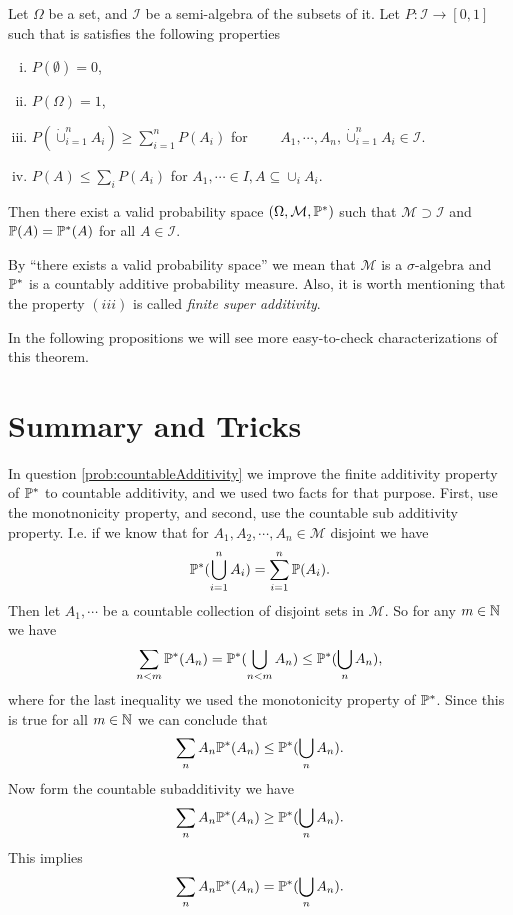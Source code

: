 \begin{theorem}
	Let $ \Omega  $ be a set, and $ \mathcal{I} $ be a semi-algebra of the subsets of it. Let $ P: \mathcal{I} \to [0,1] $ such that is satisfies the following properties
	\begin{enumerate}[(i),nosep]
		\item $ P(\emptyset) = 0  $,
		\item $ P(\Omega) = 1 $,
		\item $ P(\dot\cup_{i=1}^{n} A_i) \geq \sum_{i=1}^n P(A_i) $ for $\qquad  A_1,\cdots,A_n, \dot\cup_{i=1}^{n} A_i \in \mathcal{I}$.
		\item $ P(A) \leq \sum_i P(A_i) $ for $ A_1,\cdots \in I, A \subseteq \cup_i A_i $.
	\end{enumerate}
	Then there exist a valid probability space $ (\Omega, \mathcal{M}, \mathbb{P}^*) $ such that $ \mathcal{M} \supset \mathcal{I} $ and $ \mathbb{P}(A)= \mathbb{P}^*(A)$ for all $ A \in \mathcal{I} $.
\end{theorem}
\begin{remark}
	By ``there exists a valid probability space'' we mean that $ \mathcal{M} $ is a $ \sigma\text{-algebra} $ and $ \mathbb{P}^* $ is a countably additive probability measure. Also, it is worth mentioning that the property $ (iii) $ is called \emph{finite super additivity}.
\end{remark}
In the following propositions we will see more easy-to-check characterizations of this theorem.


\section{Summary and Tricks}
\begin{summary}
	In question \autoref{prob:countableAdditivity} we improve the finite additivity property of $ \mathbb{P}^* $ to countable additivity, and we used two facts for that purpose. First, use the monotnonicity property, and second, use the countable sub additivity property. I.e. if we know that for $ A_1, A_2, \cdots, A_n \in \mathcal{M} $ disjoint we have
	\[ \mathbb{P}^*(\bigcup_{i=1}^{n} A_i) = \sum_{i=1}^n \mathbb{P}(A_i). \]
	Then let $ A_1,\cdots $ be a countable collection of disjoint sets in $ \mathcal{M} $. So for any $ m\in \mathbb{N} $ we have
	\[ \sum_{n<m} \mathbb{P}^*(A_n) = \mathbb{P}^*(\bigcup_{n<m} A_n) \leq \mathbb{P}^*(\bigcup_n A_n), \]
	where for the last inequality we used the monotonicity property of $ \mathbb{P}^* $. Since this is true for all $ m\in \mathbb{N} $ we can conclude that 
	\[ \sum_{n} A_n \mathbb{P}^*(A_n) \leq \mathbb{P}^*(\bigcup_n A_n). \]
	Now form the countable subadditivity we have
	\[ \sum_{n} A_n \mathbb{P}^*(A_n) \geq \mathbb{P}^*(\bigcup_n A_n). \]
	This implies 
	\[ \sum_{n} A_n \mathbb{P}^*(A_n) = \mathbb{P}^*(\bigcup_n A_n). \]
\end{summary}

